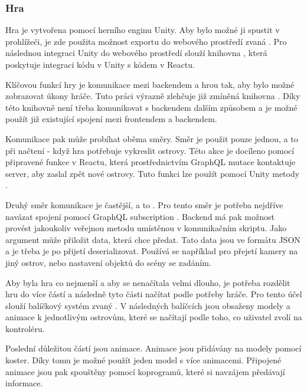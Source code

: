 \subsubsection{Hra}
Hra je vytvořena pomocí herního enginu Unity. Aby bylo možné ji spustit v prohlížeči, je zde použita možnost exportu do webového prostředí zvaná .
Pro následnou integraci Unity do webového prostředí slouží knihovna \cite{react-unity-webgl}, která poskytuje integraci kódu v Unity s kódem v Reactu.

Klíčovou funkcí hry je komunikace mezi backendem a hrou tak, aby bylo možné zobrazovat úkony hráče. Tuto práci výrazně zlehčuje již zmíněná knihovna \cite{react-unity-webgl}. Díky této knihovně není třeba komunikovat s backendem dalším způsobem a je možné použít již existující spojení mezi frontendem a backendem.\par
Komunikace pak může probíhat oběma směry. Směr  je použit pouze jednou, a to při načtení - když hra potřebuje vykreslit ostrovy. Této akce je docíleno pomocí připravené funkce v Reactu, která prostřednictvím GraphQL mutace  kontaktuje server, aby zaslal zpět nové ostrovy. Tuto funkci lze použít pomocí Unity metody .\par
Druhý směr komunikace je častější, a to . Pro tento směr je potřeba nejdříve navázat spojení pomocí GraphQL subscription . Backend má pak možnost provést jakoukoliv veřejnou metodu umístěnou v komunikačním skriptu. Jako argument může přiložit data, která chce předat. Tato data jsou ve formátu JSON a je třeba je po přijetí deserializovat. Používá se například pro přejetí kamery na jiný ostrov, nebo nastavení objektů do scény se zadáním.

Aby byla hra co nejmenší a aby se nenačítala velmi dlouho, je potřeba rozdělit hru do více částí a následně tyto části načítat podle potřeby hráče. Pro tento účel slouží balíčkový systém zvaný \cite{AssetBundle}. V následných balíčcích jsou obsaženy modely a animace k jednotlivým ostrovům, které se načítají podle toho, co uživatel zvolí na kontroléru.

Poslední důležitou částí jsou animace. Animace jsou přidávány na modely pomocí koster. Díky tomu je možné použít jeden model s více animacemi. Připojené animace jsou pak spouštěny pomocí koprogramů, které si navzájem předávají informace. 

